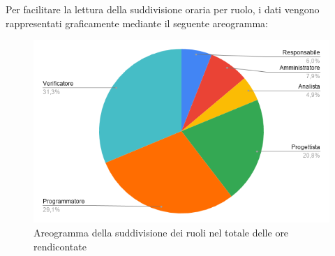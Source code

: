 \documentclass[../piano-di-progetto.tex]{subfiles}
\begin{document}
      Per facilitare la lettura della suddivisione oraria per ruolo, i dati vengono rappresentati graficamente mediante il seguente areogramma:
      \begin{figure}[H]
        \centering
        \includegraphics[width=12cm]{img/ruoli-rendicontati.png}
        \caption{Areogramma della suddivisione dei ruoli nel totale delle ore rendicontate}
        \label{fig:ore-rendicontate}
      \end{figure}
  
  
\end{document}
